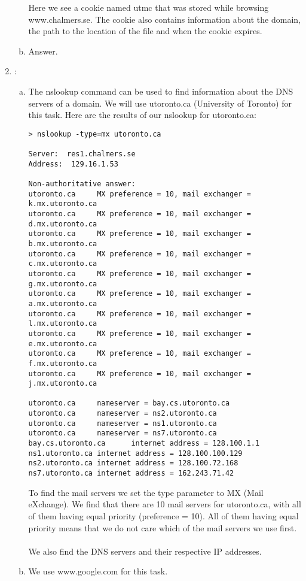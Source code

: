 \documentclass[a4paper,9pt,fleqn]{article}
\begin{document}
\begin{enumerate}[{Task} 1]
\begin{enumerate}[a)]
Here we see a cookie named {\outp \underline{\hspace{4mm}}utmc} that was stored while browsing
{\outp www.chalmers.se}. The cookie also contains information about the
domain, the path to the location of the file and when the cookie expires.
 
\item 
Answer.
\end{enumerate}

\item :
\begin{enumerate}[a)]
\item 
The {\outp nslookup} command can be used to find information about the DNS servers of a domain.
We will use {\outp utoronto.ca} (University of Toronto) for this task.  Here are the results of
our {\outp nslookup} for {\outp utoronto.ca}:

\begin{lstlisting}
> nslookup -type=mx utoronto.ca
	
Server:  res1.chalmers.se
Address:  129.16.1.53

Non-authoritative answer:
utoronto.ca     MX preference = 10, mail exchanger = k.mx.utoronto.ca
utoronto.ca     MX preference = 10, mail exchanger = d.mx.utoronto.ca
utoronto.ca     MX preference = 10, mail exchanger = b.mx.utoronto.ca
utoronto.ca     MX preference = 10, mail exchanger = c.mx.utoronto.ca
utoronto.ca     MX preference = 10, mail exchanger = g.mx.utoronto.ca
utoronto.ca     MX preference = 10, mail exchanger = a.mx.utoronto.ca
utoronto.ca     MX preference = 10, mail exchanger = l.mx.utoronto.ca
utoronto.ca     MX preference = 10, mail exchanger = e.mx.utoronto.ca
utoronto.ca     MX preference = 10, mail exchanger = f.mx.utoronto.ca
utoronto.ca     MX preference = 10, mail exchanger = j.mx.utoronto.ca

utoronto.ca     nameserver = bay.cs.utoronto.ca
utoronto.ca     nameserver = ns2.utoronto.ca
utoronto.ca     nameserver = ns1.utoronto.ca
utoronto.ca     nameserver = ns7.utoronto.ca
bay.cs.utoronto.ca      internet address = 128.100.1.1
ns1.utoronto.ca internet address = 128.100.100.129
ns2.utoronto.ca internet address = 128.100.72.168
ns7.utoronto.ca internet address = 162.243.71.42
\end{lstlisting}

To find the mail servers we set the type parameter to {\outp MX} (Mail eXchange).
We find that there are 10 mail servers for {\outp utoronto.ca}, with all of them
having equal priority (preference = 10). All of them having equal priority
means that we do not care which of the mail servers we use first. 
\\
\\
We also find the DNS servers and their respective IP addresses. 
\item 
We use {\outp www.google.com} for this task.


\end{enumerate}
\end{enumerate}
\end{document}
